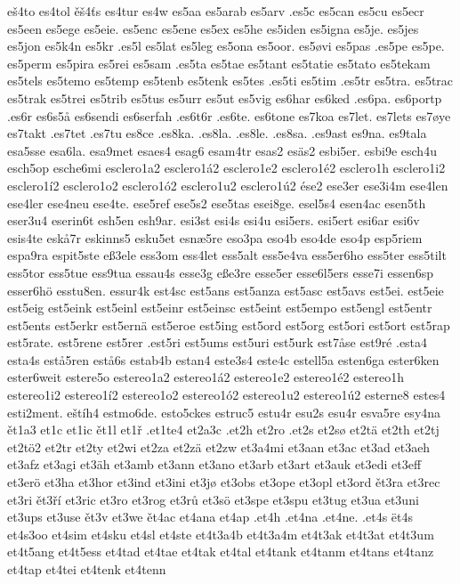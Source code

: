 eš4to
es4tol
ěš4ťs
es4tur
es4w
es5aa
es5arab
es5arv
.es5c
es5can
es5cu
es5ecr
es5een
es5ege
es5eie.
es5enc
es5ene
es5ex
es5he
es5iden
es5igna
es5je.
es5jes
es5jon
es5k4n
es5kr
.es5l
es5lat
es5leg
es5ona
es5oor.
es5øvi
es5pas
.es5pe
es5pe.
es5perm
es5pira
es5rei
es5sam
.es5ta
es5tae
es5tant
es5tatie
es5tato
es5tekam
es5tels
es5temo
es5temp
es5tenb
es5tenk
es5tes
.es5ti
es5tim
.es5tr
es5tra.
es5trac
es5trak
es5trei
es5trib
es5tus
es5urr
es5ut
es5vig
es6har
es6ked
.es6pa.
es6portp
.es6r
es6s5å
es6sendi
es6serfah
.es6t6r
.es6te.
es6tone
es7koa
es7let.
es7lets
es7øye
es7takt
.es7tet
.es7tu
es8ce
.es8ka.
.es8la.
.es8le.
.es8sa.
.es9ast
es9na.
es9tala
esa5sse
esa6la.
esa9met
esaes4
esag6
esam4tr
esas2
esäs2
esbi5er.
esbi9e
esch4u
esch5op
esche6mi
esclero1a2
esclero1á2
esclero1e2
esclero1é2
esclero1h
esclero1i2
esclero1í2
esclero1o2
esclero1ó2
esclero1u2
esclero1ú2
ése2
ese3er
ese3i4m
ese4len
ese4ler
ese4neu
ese4te.
ese5ref
ese5s2
ese5tas
esei8ge.
esel5s4
esen4ac
esen5th
eser3u4
eserin6t
esh5en
esh9ar.
esi3st
esi4s
esi4u
esi5ers.
esi5ert
esi6ar
esi6v
esis4te
eskå7r
eskinns5
esku5et
esnæ5re
eso3pa
eso4b
eso4de
eso4p
esp5riem
espa9ra
espit5ste
eß3ele
ess3om
ess4let
ess5alt
ess5e4va
ess5er6ho
ess5ter
ess5tilt
ess5tor
ess5tue
ess9tua
essau4s
esse3g
eße3re
esse5er
esse6l5ers
esse7i
essen6sp
esser6hö
esstu8en.
essur4k
est4sc
est5ans
est5anza
est5asc
est5avs
est5ei.
est5eie
est5eig
est5eink
est5einl
est5einr
est5einsc
est5eint
est5empo
est5engl
est5entr
est5ents
est5erkr
est5ernä
est5eroe
est5ing
est5ord
est5org
est5ori
est5ort
est5rap
est5rate.
est5rene
est5rer
.est5ri
est5ums
est5uri
est5urk
est7åse
est9ré
.esta4
esta4s
estå5ren
estå6s
estab4b
estan4
este3s4
este4c
estell5a
esten6ga
ester6ken
ester6weit
estere5o
estereo1a2
estereo1á2
estereo1e2
estereo1é2
estereo1h
estereo1i2
estereo1í2
estereo1o2
estereo1ó2
estereo1u2
estereo1ú2
esterne8
estes4
esti2ment.
eštíh4
estmo6de.
esto5ckes
estruc5
estu4r
esu2s
esu4r
esva5re
esy4na
ět1a3
et1c
et1ic
ět1l
et1ř
.et1te4
et2a3c
.et2h
et2ro
.et2s
et2sø
et2tä
et2th
et2tj
et2tö2
et2tr
et2ty
et2wi
et2za
et2zä
et2zw
et3a4mi
et3aan
et3ac
et3ad
et3aeh
et3afz
et3agi
et3äh
et3amb
et3ann
et3ano
et3arb
et3art
et3auk
et3edi
et3eff
et3erö
et3ha
et3hor
et3ind
et3ini
et3jø
et3obs
et3ope
et3opl
et3ord
ět3ra
et3rec
et3ri
ět3ří
et3ric
et3ro
et3rog
et3rů
et3sö
et3spe
et3spu
et3tug
et3ua
et3uni
et3ups
et3use
ět3v
et3we
ět4ac
et4ana
et4ap
.et4h
.et4na
.et4ne.
.et4s
ët4s
et4s3oo
et4sim
et4sku
et4sl
et4ste
et4t3a4b
et4t3a4m
et4t3ak
et4t3at
et4t3um
et4t5ang
et4t5ess
et4tad
et4tae
et4tak
et4tal
et4tank
et4tanm
et4tans
et4tanz
et4tap
et4tei
et4tenk
et4tenn
